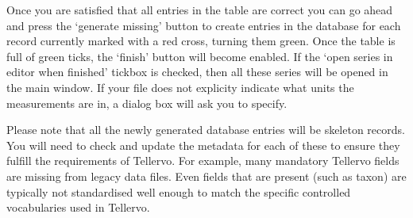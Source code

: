 Once you are satisfied that all entries in the table are correct you can go ahead and press the `generate missing' button to create entries in the database for each record currently marked with a red cross, turning them green.  Once the table is full of green ticks, the `finish' button will become enabled.  If the `open series in editor when finished' tickbox is checked, then all these series will be opened in the main window. If your file does not explicity indicate what units the measurements are in, a dialog box will ask you to specify.  

Please note that all the newly generated database entries will be skeleton records.  You will need to check and update the metadata for each of these to ensure they fulfill the requirements of Tellervo.  For example, many mandatory Tellervo fields are missing from legacy data files.  Even fields that are present (such as taxon) are typically not standardised well enough to match the specific controlled vocabularies used in Tellervo.



